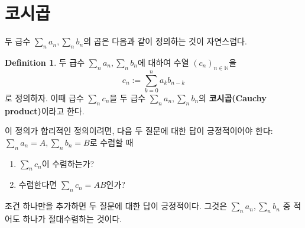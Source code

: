 \documentclass[11pt]{book}
\numberwithin{equation}{chapter}
\def\NN{\mathbb{N}}
\theoremstyle{definition}
\newtheorem{defn}[thm]{Definition}
\newenvironment{enum}
	{\begin{enumerate}[label=(\alph*), leftmargin=2\parindent]}
	{\end{enumerate}}
\begin{document}
\section{코시곱} \label{sec5.9}

두 급수 \(\sum_n a_n, \sum_n b_n\)의 곱은 다음과 같이 정의하는 것이 자연스럽다.

\begin{defn}
    두 급수 \(\sum_n a_n, \sum_n b_n\)에 대하여 수열 \((c_n)_{n \in \NN}\)을
    \[
        c_n := \sum_{k=0}^n a_k b_{n-k}
    \]
    로 정의하자. 이때 급수 \(\sum_n c_n\)을 두 급수 \(\sum_n a_n, \sum_n b_n\)의 \textbf{코시곱(Cauchy product)}이라고 한다. 
\end{defn}

이 정의가 합리적인 정의이려면, 다음 두 질문에 대한 답이 긍정적이어야 한다: \(\sum_n a_n = A, \sum_n b_n = B\)로 수렴할 때

\begin{enum}
    \item \(\sum_n c_n\)이 수렴하는가?
    \item 수렴한다면 \(\sum_n c_n = AB\)인가?
\end{enum}

조건 하나만을 추가하면 두 질문에 대한 답이 긍정적이다. 그것은 \(\sum_n a_n, \sum_n b_n\) 중 적어도 하나가 절대수렴하는 것이다.
\end{document}
